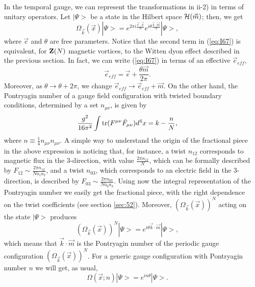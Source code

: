 In the temporal gauge, we can represent the
transformations in ii-2) in terms of unitary operators. Let $|\Psi>$ be a
state in the Hilbert space ${\cal H}(\vec{m})$; then, we get
\begin{equation}
\Omega_{\vec{k}}(\vec{x}) |\Psi> = e^{2 \pi i \frac {\vec{e}
\cdot \vec{k}}{N}} e^{ i \theta \frac {\vec{k}
\cdot \vec{m}}{N}} |\Psi>,
\label{eq:I67}
\end{equation}
where $\vec{e}$ and $\theta$ are free parameters. Notice that the second term in (\ref{eq:I67}) 
is equivalent, for ${\bf Z}(N)$ magnetic vortices, to the Witten dyon effect described in the 
previous section. In fact, we can write (\ref{eq:I67}) in terms of 
an effective $\vec{e}_{eff}$,
\begin{equation}
\vec{e}_{eff} = \vec{e} + \frac {\theta \vec{m}}{2 \pi}.
\label{nue}
\end{equation}
Moreover, as $\theta \rightarrow \theta + 2 \pi$, we change
$\vec{e}_{eff} \rightarrow \vec{e}_{eff} + \vec{m}$. 
On the other hand, the Pontryagin number of a
gauge field configuration with twisted boundary conditions,
determined by a set $n_{\mu \nu}$, is given by \cite{tHcmp}
\begin{equation}
\frac {g^2}{16 \pi^2} \int \hbox{tr} (F^{\mu \nu} \tilde{F}_{\mu
\nu}) d^4 x= k- \frac {n}{N}, 
\end{equation}
where \( n \equiv \frac {1}{4} n_{\mu \nu} n_{\mu \nu} \).
A simple way to understand the origin of the fractional piece in
the above expression is noticing that, for instance, a twist
$n_{12}$ corresponds to magnetic flux in the $3$-direction, with
value $\frac {2 \pi n_{12}}{N}$, which can be formally described
by $F_{12} \sim \frac {2 \pi n_{12}}{Na_1 a_2}$, and a twist
$n_{03}$, which corresponds to an electric field in the
$3$-direction, is described by $F_{03} \sim \frac {2 \pi
n_{03}}{Na_0a_3}$. Using now the integral representation of the
Pontryagin number we easily get the fractional piece, with the
right dependence on the twist coefficients (see section
\ref{sec:52}). Moreover, $(\Omega_{\vec{k}}(\vec{x}))^N$ acting
on the state $|\Psi>$ produces
\begin{equation}
(\Omega_{\vec{k}}(\vec{x}))^N |\Psi> = e^{i \theta \vec{k} \cdot
\vec{m}} |\Psi>,
\label{eq:I68}
\end{equation}
which means that $\vec{k} \cdot \vec{m}$ is the Pontryagin number
of the periodic gauge configuration
$(\Omega_{\vec{k}}(\vec{x}))^N$. For a generic gauge
configuration with Pontryagin number $n$ we will get, as usual,
\begin{equation}
\Omega(\vec{x};n) |\Psi> = e^{in \theta } |\Psi>.
\label{eq:I69}
\end{equation}
  
